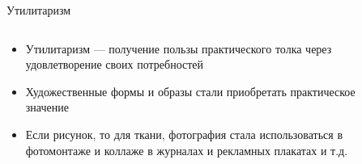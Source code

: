 \begin{frame}{Утилитаризм}
    \begin{columns}[T,onlytextwidth]
        \begin{column}{0.56\textwidth}
            \begin{itemize}
                \item<1-> Утилитаризм --- получение пользы практического толка через удовлетворение своих потребностей
                \item<2-> Художественные формы и образы стали приобретать практическое значение
                \item<3-> Если рисунок, то для ткани, фотография стала использоваться в
                фотомонтаже и коллаже в журналах и рекламных плакатах и т.д.
            \end{itemize}
        \end{column}
        \begin{column}{0.4\textwidth}
        \end{column}
    \end{columns}

\end{frame}